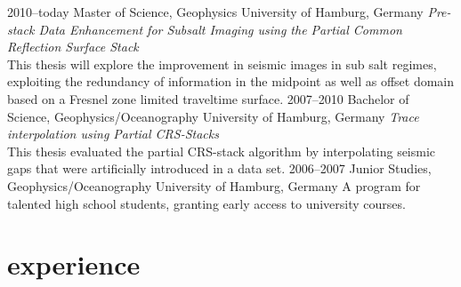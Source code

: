 \documentclass[]{friggeri-cv} %
\begin{document}
\begin{entrylist}
\entry
{2010--today}
{Master {\normalfont of Science, Geophysics}}
{University of Hamburg, Germany}
{\emph{Pre-stack Data Enhancement for Subsalt Imaging using the Partial Common Reflection Surface Stack} \\ This thesis will explore the improvement in seismic images in sub salt regimes, exploiting the redundancy of information in the midpoint as well as offset domain based on a Fresnel zone limited traveltime surface.}
\entry
{2007--2010}
{Bachelor {\normalfont of Science, Geophysics/Oceanography}}
{University of Hamburg, Germany}
{\emph{Trace interpolation using Partial CRS-Stacks} \\ This thesis evaluated the partial CRS-stack algorithm by interpolating seismic gaps that were artificially introduced in a data set.}
\entry
{2006--2007}
{Junior {\normalfont Studies, Geophysics/Oceanography}}
{University of Hamburg, Germany}
{A program for talented high school students, granting early access to university courses.}
\end{entrylist}


\section{experience}
\end{document}
